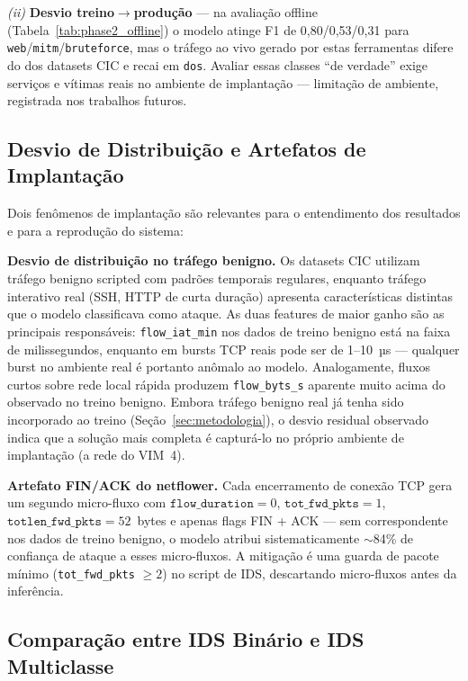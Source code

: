 \documentclass[12pt]{article}
\begin{document}
\textit{(ii)} \textbf{Desvio treino$\rightarrow$produção} — na avaliação offline
(Tabela~\ref{tab:phase2_offline}) o modelo atinge F1 de 0,80/0,53/0,31 para
\texttt{web}/\texttt{mitm}/\texttt{bruteforce}, mas o tráfego ao vivo gerado por
estas ferramentas difere do dos datasets CIC e recai em \texttt{dos}. Avaliar
essas classes ``de verdade'' exige serviços e vítimas reais no ambiente de
implantação — limitação de ambiente, registrada nos trabalhos futuros.

\subsection{Desvio de Distribuição e Artefatos de Implantação}

Dois fenômenos de implantação são relevantes para o entendimento dos resultados
e para a reprodução do sistema:

\textbf{Desvio de distribuição no tráfego benigno.}
Os datasets CIC utilizam tráfego benigno scripted com padrões temporais
regulares, enquanto tráfego interativo real (SSH, HTTP de curta duração)
apresenta características distintas que o modelo classificava como ataque.
As duas features de maior ganho são as principais responsáveis: \texttt{flow\_iat\_min}
nos dados de treino benigno está na faixa de milissegundos, enquanto em bursts
TCP reais pode ser de 1--10~µs — qualquer burst no ambiente real é portanto
anômalo ao modelo. Analogamente, fluxos curtos sobre rede local rápida
produzem \texttt{flow\_byts\_s} aparente muito acima do observado no treino
benigno. Embora tráfego benigno real já tenha sido incorporado ao treino
(Seção~\ref{sec:metodologia}), o desvio residual observado indica que a solução
mais completa é capturá-lo no próprio ambiente de implantação (a rede do VIM~4).

\textbf{Artefato FIN/ACK do netflower.}
Cada encerramento de conexão TCP gera um segundo micro-fluxo com
$\texttt{flow\_duration} = 0$, $\texttt{tot\_fwd\_pkts} = 1$,
$\texttt{totlen\_fwd\_pkts} = 52$~bytes e apenas flags FIN + ACK — sem
correspondente nos dados de treino benigno, o modelo atribui sistematicamente
$\sim$84\% de confiança de ataque a esses micro-fluxos. A mitigação é uma
guarda de pacote mínimo (\texttt{tot\_fwd\_pkts} $\geq 2$) no script de IDS,
descartando micro-fluxos antes da inferência.

\subsection{Comparação entre IDS Binário e IDS Multiclasse}
\end{document}

